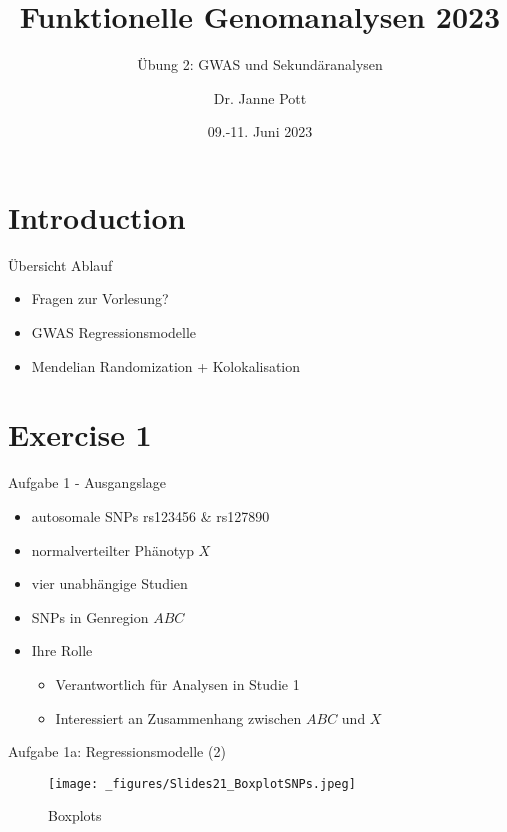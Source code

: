 \documentclass{beamer}
\title{Funktionelle Genomanalysen 2023}
\subtitle{Übung 2: GWAS und Sekundäranalysen}
\author{Dr. Janne Pott}
\date{09.-11. Juni 2023}
\begin{document}
\begin{frame}
\titlepage
\end{frame}

\section{Introduction}

\begin{frame}{Übersicht Ablauf}
\begin{itemize}
    \item Fragen zur Vorlesung?
    \item GWAS Regressionsmodelle
    \item Mendelian Randomization + Kolokalisation 
\end{itemize}
\end{frame}

\section{Exercise 1}

\begin{frame}{Aufgabe 1 - Ausgangslage}
\begin{itemize}
    \item autosomale SNPs rs123456 \& rs127890
    \item normalverteilter Phänotyp $X$
    \item vier unabhängige Studien
    \item SNPs in Genregion $ABC$
    \item Ihre Rolle
    \begin{itemize}
        \item Verantwortlich für Analysen in Studie 1
        \item Interessiert an Zusammenhang zwischen $ABC$ und $X$
    \end{itemize}
\end{itemize} 
\end{frame}

\begin{frame}{Aufgabe 1a: Regressionsmodelle (2)}
\begin{figure}[h]
\begin{center}
\texttt{[image: \_figures/Slides21\_BoxplotSNPs.jpeg]}
\caption{Boxplots}
\label{fig:Boxplots}
\end{center}
\end{figure}
\end{frame}
\end{document}
